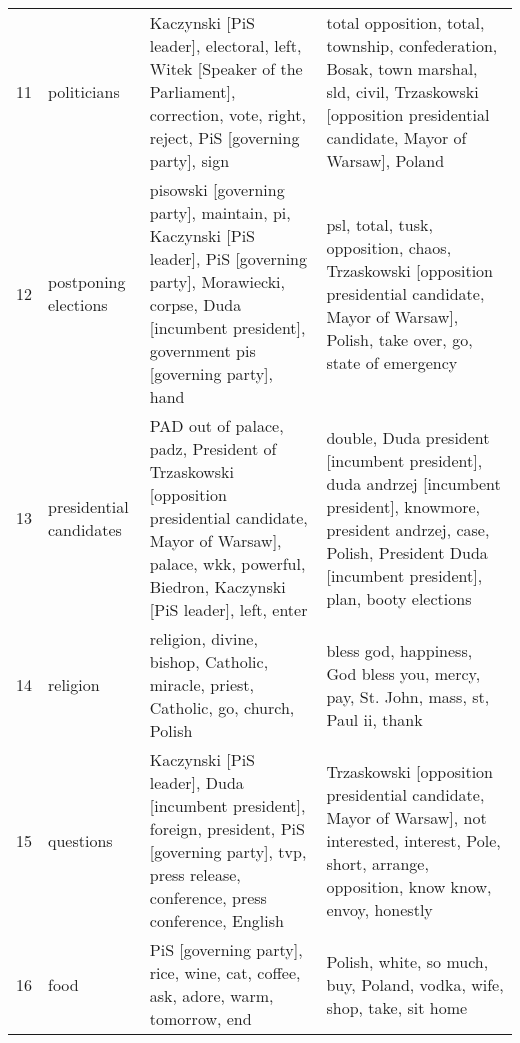 \begin{tabular}{p{2cm}p{2cm}p{5cm}p{5cm}}
          11 &              politicians &                                          Kaczynski [PiS leader], electoral, left, Witek [Speaker of the Parliament], correction, vote, right, reject, PiS [governing party], sign &                                      total opposition, total, township, confederation, Bosak, town marshal, sld, civil, Trzaskowski [opposition presidential candidate, Mayor of Warsaw], Poland \\
          12 &     postponing elections &   pisowski [governing party], maintain, pi, Kaczynski [PiS leader], PiS [governing party], Morawiecki, corpse, Duda [incumbent president], government pis [governing party], hand &                                                 psl, total, tusk, opposition, chaos, Trzaskowski [opposition presidential candidate, Mayor of Warsaw], Polish, take over, go, state of emergency \\
          13 &  presidential candidates &       PAD out of palace, padz, President of Trzaskowski [opposition presidential candidate, Mayor of Warsaw], palace, wkk, powerful, Biedron, Kaczynski [PiS leader], left, enter &         double, Duda president [incumbent president], duda andrzej [incumbent president], knowmore, president andrzej, case, Polish, President Duda [incumbent president], plan, booty elections \\
          14 &                 religion &                                                                                                 religion, divine, bishop, Catholic, miracle, priest, Catholic, go, church, Polish &                                                                                                              bless god, happiness, God bless you, mercy, pay, St. John, mass, st, Paul ii, thank \\
          15 &                questions &                          Kaczynski [PiS leader], Duda [incumbent president], foreign, president, PiS [governing party], tvp, press release, conference, press conference, English &                                         Trzaskowski [opposition presidential candidate, Mayor of Warsaw], not interested, interest, Pole, short, arrange, opposition, know know, envoy, honestly \\
          16 &                     food &                                                                                                   PiS [governing party], rice, wine, cat, coffee, ask, adore, warm, tomorrow, end &                                                                                                                           Polish, white, so much, buy, Poland, vodka, wife, shop, take, sit home \\

\end{tabular}
